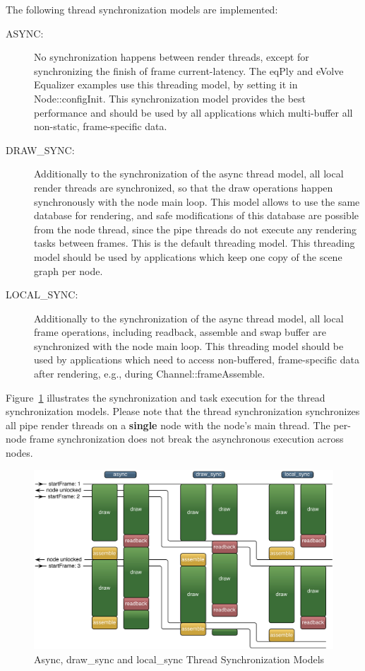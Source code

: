 \documentclass[10pt,a4]{scrartcl}
\newcommand{\fig}[1]{Figure~\ref{#1}}
\begin{document}
The following thread synchronization models are implemented:
\begin{description}
\item[ASYNC:] No synchronization happens between render threads, except
  for synchronizing the finish of frame \textsf{current-latency}. The
  \textsf{eqPly} and \textsf{eVolve} Equalizer examples use this
  threading model, by setting it in \textsf{Node::configInit}. This
  synchronization model provides the best performance and should be used
  by all applications which multi-buffer all non-static, frame-specific
  data.
\item[DRAW\_SYNC:] Additionally to the synchronization of the async
  thread model, all local render threads are synchronized, so that the
  draw operations happen synchronously with the node main loop. This
  model allows to use the same database for rendering, and safe
  modifications of this database are possible from the node thread,
  since the pipe threads do not execute any rendering tasks between
  frames. This is the default threading model. This threading model
  should be used by applications which keep one copy of the scene graph
  per node.
\item[LOCAL\_SYNC:] Additionally to the synchronization of the async
  thread model, all local frame operations, including readback, assemble
  and swap buffer are synchronized with the node main loop. This
  threading model should be used by applications which need to access
  non-buffered, frame-specific data after rendering, e.g., during
  \textsf{Channel::frameAssemble}.
\end{description}

\fig{fThreadModels} illustrates the synchronization and task execution
for the thread synchronization models. Please note that the thread
synchronization synchronizes all pipe render threads on a
\textbf{single} node with the node's main thread. The per-node frame
synchronization does not break the asynchronous execution across
nodes.

\begin{figure}[h!t]\center
  \includegraphics[width=.9\textwidth]{images/threadModels.pdf}
  {\caption{\label{fThreadModels}Async, draw\_sync and local\_sync
    Thread Synchronization Models}}
\end{figure}
\end{document}
